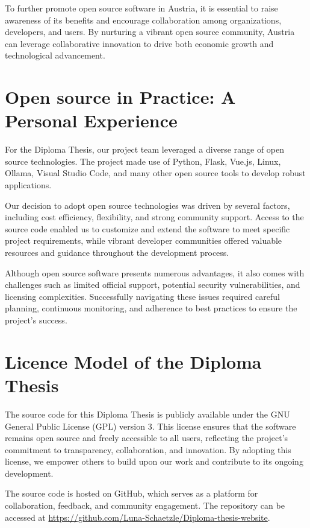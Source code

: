 To further promote open source software in Austria, 
it is essential to raise awareness of its benefits and encourage collaboration among organizations, developers, and users. 
By nurturing a vibrant open source community, Austria can leverage collaborative innovation to drive both economic growth and technological advancement.

\cite{Open-Source-Guide-Austria}

\section{Open source in Practice: A Personal Experience}

For the Diploma Thesis, our project team leveraged a diverse range of open source technologies. 
The project made use of Python, Flask, Vue.js, Linux, Ollama, Visual Studio Code, 
and many other open source tools to develop robust applications.

Our decision to adopt open source technologies was driven by several factors, 
including cost efficiency, flexibility, and strong community support. 
Access to the source code enabled us to customize and extend the software to meet specific project requirements, 
while vibrant developer communities offered valuable resources and guidance throughout the development process.

Although open source software presents numerous advantages, it also comes with challenges such as limited official support, 
potential security vulnerabilities, and licensing complexities. Successfully navigating these issues required careful planning, 
continuous monitoring, and adherence to best practices to ensure the project's success.

\section{Licence Model of the Diploma Thesis}

The source code for this Diploma Thesis is publicly available under the GNU General Public License (GPL) version 3. 
This license ensures that the software remains open source and freely accessible to all users, 
reflecting the project's commitment to transparency, collaboration, and innovation. By adopting this license, 
we empower others to build upon our work and contribute to its ongoing development.

The source code is hosted on GitHub, which serves as a platform for collaboration, feedback, and community engagement. 
The repository can be accessed at \url{https://github.com/Luna-Schaetzle/Diploma-thesis-website}.


